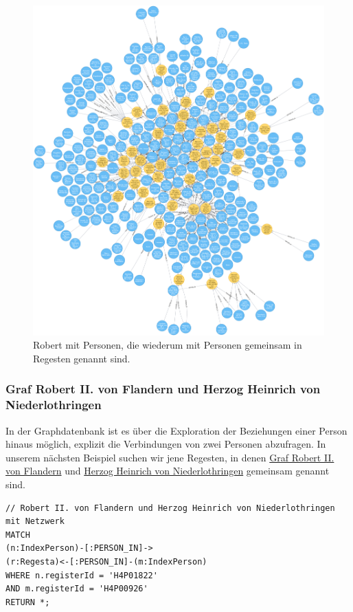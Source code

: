 \documentclass[ngerman,]{scrreprt}
\begin{document}
\begin{figure}
\centering
\includegraphics{Bilder/RI2Graph/Robert-viel.png}
\caption{Robert mit Personen, die wiederum mit Personen gemeinsam in Regesten genannt sind.}
\end{figure}

\subsubsection{Graf Robert II. von Flandern und Herzog Heinrich von Niederlothringen}\label{graf-robert-ii.-von-flandern-und-herzog-heinrich-von-niederlothringen}

In der Graphdatenbank ist es über die Exploration der Beziehungen einer Person hinaus möglich, explizit die Verbindungen von zwei Personen abzufragen. In unserem nächsten Beispiel suchen wir jene Regesten, in denen \href{https://de.wikipedia.org/wiki/Robert_II._(Flandern)}{Graf Robert II. von Flandern} und \href{https://de.wikipedia.org/wiki/Heinrich_I._(Limburg)}{Herzog Heinrich von Niederlothringen} gemeinsam genannt sind.

\begin{verbatim}
// Robert II. von Flandern und Herzog Heinrich von Niederlothringen mit Netzwerk
MATCH
(n:IndexPerson)-[:PERSON_IN]->
(r:Regesta)<-[:PERSON_IN]-(m:IndexPerson)
WHERE n.registerId = 'H4P01822'
AND m.registerId = 'H4P00926'
RETURN *;
\end{verbatim}
\end{document}
